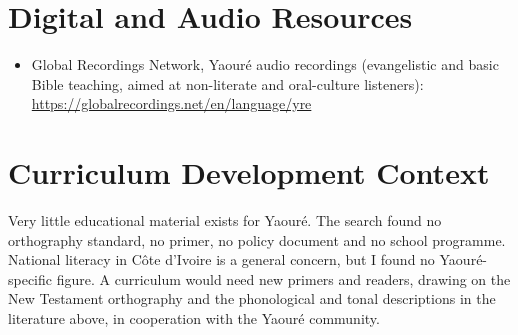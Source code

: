 \documentclass[12pt]{article}
\begin{document}
\section{Digital and Audio Resources}
\begin{itemize}
\item Global Recordings Network, Yaour\'e audio recordings (evangelistic and basic Bible teaching, aimed at non-literate and oral-culture listeners): \url{https://globalrecordings.net/en/language/yre}
\end{itemize}

\section{Curriculum Development Context}
Very little educational material exists for Yaour\'e. The search found no orthography standard, no primer, no policy document and no school programme. National literacy in C\^ote d'Ivoire is a general concern, but I found no Yaour\'e-specific figure. A curriculum would need new primers and readers, drawing on the New Testament orthography and the phonological and tonal descriptions in the literature above, in cooperation with the Yaour\'e community.
\end{document}
